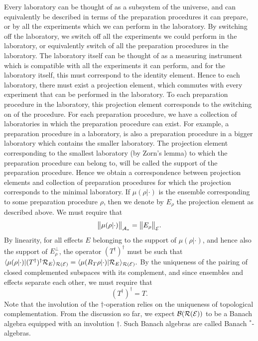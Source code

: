 \documentclass[11pt]{article}
\begin{document}
Every laboratory can be thought of as a subsystem of the universe, and can equivalently be described in terms of the preparation procedures it can prepare, or by all the experiments which we can perform in the laboratory. By switching off the laboratory, we switch off all the experiments we could perform in the laboratory, or equivalently switch of all the preparation procedures in the laboratory. The laboratory itself can be thought of as a measuring instrument which is compatible with all the experiments it can perform, and for the laboratory itself, this must correspond to the identity element. Hence to each laboratory, there must exist a projection element, which commutes with every experiment that can be performed in the laboratory. To each preparation procedure in the laboratory, this projection element corresponds to the switching on of the procedure. For each preparation procedure, we have a collection of laboratories in which the preparation procedure can exist. For example, a preparation procedure in a laboratory, is also a preparation procedure in a bigger laboratory which contains the smaller laboratory. The projection element corresponding to the smallest laboratory (by Zorn's lemma) to which the preparation procedure can belong to, will be called the support of the preparation procedure. Hence we obtain a correspondence between projection elements and collection of preparation procedures for which the projection corresponds to the minimal laboratory. If $\mu(\rho|\cdot)$ is the ensemble corresponding to some preparation procedure $\rho$, then we denote by $E_\rho$ the projection element as described above. We must require that
$$\big\|\mu(\rho|\cdot)\big\|_{\mathcal{A}_* }=\big\| E_\rho\big\|_{\mathcal{E}}.$$
By linearity, for all effects $E$ belonging to the support of $\mu(\rho|\cdot)$, and hence also the support of $E_\rho^\perp$, the operator $(T^\dagger)^\dagger$ must be such that $\langle \mu(\rho|\cdot)|(T^{\dagger})^\dagger \mathcal{R}_E\rangle_{\mathcal{R}(\mathcal{E})}=\langle \mu(R_T\rho|\cdot)|\mathcal{R}_E\rangle_{\mathcal{R}(\mathcal{E})}.$ By the uniqueness of the pairing of closed complemented subspaces with its complement, and since ensembles and effects separate each other, we must require that
$$(T^\dagger)^\dagger=T.$$
Note that the involution of the $\dagger$-operation relies on the uniqueness of topological complementation. From the discussion so far, we expect $\mathcal{B}(\mathcal{R}(\mathcal{E}))$ to be a Banach algebra equipped with an involution $\dagger$. Such Banach algebras are called Banach $^*$-algebras.
\end{document}

